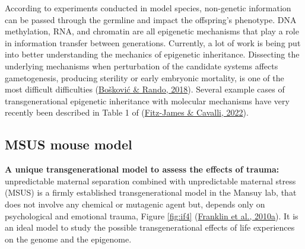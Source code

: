 \documentclass[12pt,twoside]{reedthesis}
\begin{document}
According to experiments conducted in model species, non-genetic
information can be passed through the germline and impact the
offspring's phenotype. DNA methylation, RNA, and chromatin are all
epigenetic mechanisms that play a role in information transfer between
generations. Currently, a lot of work is being put into better
understanding the mechanics of epigenetic inheritance. Dissecting the
underlying mechanisms when perturbation of the candidate systems affects
gametogenesis, producing sterility or early embryonic mortality, is one
of the most difficult difficulties (\protect\hyperlink{ref-bokovi2018}{Bošković \& Rando, 2018}). Several example cases
of transgenerational epigenetic inheritance with molecular mechanisms
have very recently been described in Table 1 of (\protect\hyperlink{ref-fitz-james2022}{Fitz-James \& Cavalli, 2022}).

\hypertarget{msus-mouse-model}{%
\subsection*{MSUS mouse model}\label{msus-mouse-model}}

\textbf{A unique transgenerational model to assess the effects of trauma:}
unpredictable maternal separation combined with unpredictable maternal
stress (MSUS) is a firmly established transgenerational model in the
Mansuy lab, that does not involve any chemical or mutagenic agent but,
depends only on psychological and emotional trauma, Figure \ref{fig:if4}
(\protect\hyperlink{ref-franklin2010}{Franklin et al., 2010a}). It is an ideal model to study the possible
transgenerational effects of life experiences on the genome and the
epigenome.
\end{document}
